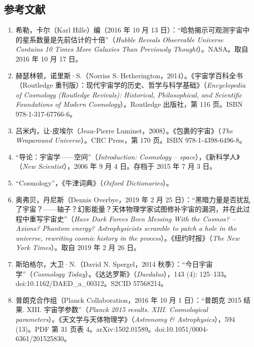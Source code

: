 \subsection{参考文献}
\begin{enumerate}
\item 希勒，卡尔（Karl Hille）编（2016 年 10 月 13 日）：“哈勃揭示可观测宇宙中的星系数量是先前估计的十倍”（\emph{Hubble Reveals Observable Universe Contains 10 Times More Galaxies Than Previously Thought}）。NASA。取自 2016 年 10 月 17 日。  

\item 赫瑟林顿，诺里斯·S.（Norriss S. Hetherington，2014）。《宇宙学百科全书（Routledge 重刊版）：现代宇宙学的历史、哲学与科学基础》（\emph{Encyclopedia of Cosmology (Routledge Revivals): Historical, Philosophical, and Scientific Foundations of Modern Cosmology}）。Routledge 出版社，第 116 页。ISBN 978-1-317-67766-6。  

\item 吕米内，让-皮埃尔（Jean-Pierre Luminet，2008）。《包裹的宇宙》（\emph{The Wraparound Universe}）。CRC Press，第 170 页。ISBN 978-1-4398-6496-8。  

\item “导论：宇宙学——空间”（\emph{Introduction: Cosmology – space}），《新科学人》（\emph{New Scientist}），2006 年 9 月 4 日。存档于 2015 年 7 月 3 日。  

\item “Cosmology”，《牛津词典》（\emph{Oxford Dictionaries}）。  

\item 奥弗贝，丹尼斯（Dennis Overbye，2019 年 2 月 25 日）：“黑暗力量是否扰乱了宇宙？——轴子？幻影能量？天体物理学家试图修补宇宙的漏洞，并在此过程中重写宇宙史”（\emph{Have Dark Forces Been Messing With the Cosmos? – Axions? Phantom energy? Astrophysicists scramble to patch a hole in the universe, rewriting cosmic history in the process}）。《纽约时报》（\emph{The New York Times}）。取自 2019 年 2 月 26 日。  

\item 斯珀格尔，大卫·N.（David N. Spergel，2014 秋季）：“今日宇宙学”（\emph{Cosmology Today}）。《达达罗斯》（\emph{Daedalus}），143 (4): 125–133。doi:10.1162/DAED\_a\_00312。S2CID 57568214。  

\item 普朗克合作组（Planck Collaboration，2016 年 10 月 1 日）：“普朗克 2015 结果. XIII. 宇宙学参数”（\emph{Planck 2015 results. XIII. Cosmological parameters}）。《天文学与天体物理学》（\emph{Astronomy & Astrophysics}），594 (13)。PDF 第 31 页表 4。arXiv:1502.01589。doi:10.1051/0004-6361/201525830。  


\end{enumerate}
